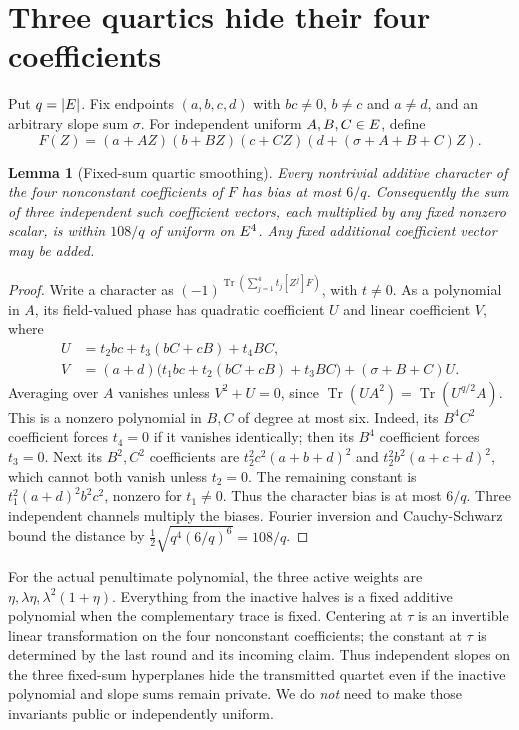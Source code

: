 \documentclass[11pt]{article}
\newtheorem{lemma}{Lemma}
\begin{document}
\section{Three quartics hide their four coefficients}

Put $q=|E|$. Fix endpoints $(a,b,c,d)$ with $bc\ne0$, $b\ne c$ and $a\ne d$, and an arbitrary slope sum $\sigma$. For independent uniform $A,B,C\in E$, define
\[
 F(Z)=(a+AZ)(b+BZ)(c+CZ)(d+(\sigma+A+B+C)Z).
\]

\begin{lemma}[Fixed-sum quartic smoothing]
Every nontrivial additive character of the four nonconstant coefficients of $F$ has bias at most $6/q$. Consequently the sum of three independent such coefficient vectors, each multiplied by any fixed nonzero scalar, is within $108/q$ of uniform on $E^4$. Any fixed additional coefficient vector may be added.
\end{lemma}
\begin{proof}
Write a character as $(-1)^{\operatorname{Tr}(\sum_{j=1}^4t_j[Z^j]F)}$, with $t\ne0$. As a polynomial in $A$, its field-valued phase has quadratic coefficient $U$ and linear coefficient $V$, where
\[
\begin{aligned}
 U&=t_2bc+t_3(bC+cB)+t_4BC,\\
 V&=(a+d)\bigl(t_1bc+t_2(bC+cB)+t_3BC\bigr)
       +(\sigma+B+C)U.
\end{aligned}
\]
Averaging over $A$ vanishes unless $V^2+U=0$, since $\operatorname{Tr}(UA^2)=\operatorname{Tr}(U^{q/2}A)$. This is a nonzero polynomial in $B,C$ of degree at most six. Indeed, its $B^4C^2$ coefficient forces $t_4=0$ if it vanishes identically; then its $B^4$ coefficient forces $t_3=0$. Next its $B^2,C^2$ coefficients are $t_2^2c^2(a+b+d)^2$ and $t_2^2b^2(a+c+d)^2$, which cannot both vanish unless $t_2=0$. The remaining constant is $t_1^2(a+d)^2b^2c^2$, nonzero for $t_1\ne0$. Thus the character bias is at most $6/q$. Three independent channels multiply the biases. Fourier inversion and Cauchy-Schwarz bound the distance by $\tfrac12\sqrt{q^4(6/q)^6}=108/q$.
\end{proof}

For the actual penultimate polynomial, the three active weights are $\eta,\lambda\eta,\lambda^2(1+\eta)$. Everything from the inactive halves is a fixed additive polynomial when the complementary trace is fixed. Centering at $\tau$ is an invertible linear transformation on the four nonconstant coefficients; the constant at $\tau$ is determined by the last round and its incoming claim. Thus independent slopes on the three fixed-sum hyperplanes hide the transmitted quartet even if the inactive polynomial and slope sums remain private. We do \emph{not} need to make those invariants public or independently uniform.
\end{document}
